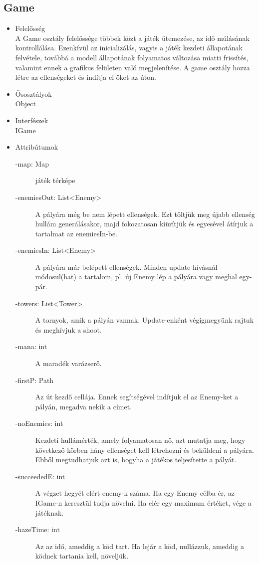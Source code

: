\subsection{Game}
\begin{itemize}
\item Felelősség\\
A Game osztály felelőssége többek közt a játék ütemezése, az idő múlásának kontrollálása. Ezenkívül az inicializálás, vagyis a játék kezdeti állapotának felvétele, továbbá a modell állapotának folyamatos változása miatti frissítés, valamint ennek a grafikus felületen való megjelenítése. A game osztály hozza létre az ellenségeket és indítja el őket az úton.
\item Ősosztályok\\
Object
\item Interfészek\\
IGame
\item Attribútumok\\
	\begin{description}
		\item[-map: Map] játék térképe
\item[-enemiesOut: List<Enemy>] A pályára még be nem lépett ellenségek. Ezt töltjük meg újabb ellenség hullám generálásakor, majd fokozatosan kiürítjük és egyesével átírjuk a tartalmat az enemiesIn-be. 
\item[-enemiesIn: List<Enemy>] A pályára már belépett ellenségek. Minden update hívásnál módosul(hat) a tartalom, pl. új Enemy lép a pályára vagy meghal egy-pár. 
\item[-towers: List<Tower>] A tornyok, amik a pályán vannak. Update-enként végigmegyünk rajtuk és meghívjuk a shoot. 
\item[-mana: int] A maradék varázserő. 
\item[-firstP: Path] Az út kezdő cellája. Ennek segítségével indítjuk el az Enemy-ket a pályán, megadva nekik a címet. 
\item[-noEnemies: int] Kezdeti hullámérték, amely folyamatosan nő, azt mutatja meg, hogy következő körben hány ellenséget kell létrehozni és beküldeni a pályára. Ebből megtudhatjuk azt is, hogyha a játékos teljesítette a pályát. 
\item[-succeededE: int] A végzet hegyét elért enemy-k száma. Ha egy Enemy célba ér, az IGame-n keresztül tudja növelni. Ha elér egy maximum értéket, vége a játéknak. 
\item[-hazeTime: int] Az az idő, ameddig a köd tart. Ha lejár a köd, nullázzuk, ameddig a ködnek tartania kell, növeljük. 




\end{description}
\end{itemize}
